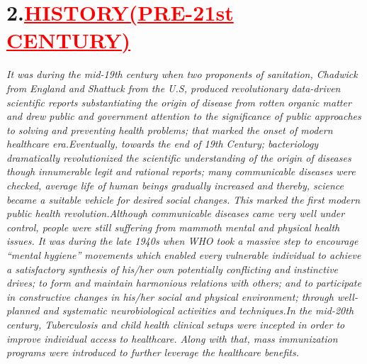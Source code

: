 \documentclass[12pt]{article}
\begin{document}
\section*{\textbf{2.\hspace{1cm}\textcolor{red}{\underline{\huge{HISTORY(PRE-21st CENTURY)}}}}}
\hspace{1cm}\large{\emph{It was during the mid-19th century when two proponents of sanitation, Chadwick from England and Shattuck from the U.S, produced revolutionary data-driven scientific reports substantiating the origin of disease from rotten organic matter and drew public and government attention to the significance of public approaches to solving and preventing health problems; that marked the onset of modern healthcare era.\newline Eventually, towards the end of 19th Century; bacteriology dramatically revolutionized the scientific understanding of the origin of diseases though innumerable legit and rational reports; many communicable diseases were checked, average life of human beings gradually increased and thereby, science became a suitable vehicle for desired social changes. This marked the first modern public health revolution.\newline Although communicable diseases came very well under control, people were still suffering from mammoth mental and physical health issues. It was during the late 1940s when WHO took a massive step to encourage “mental hygiene” movements which enabled every vulnerable individual to achieve a satisfactory synthesis of his/her own potentially conflicting and instinctive drives; to form and maintain harmonious relations with others; and to participate in constructive changes in his/her social and physical environment; through well-planned and systematic neurobiological activities and techniques.\newline In the mid-20th century, Tuberculosis and child health clinical setups were incepted in order to improve individual access to healthcare. Along with that, mass immunization programs were introduced to further leverage the healthcare benefits.}}
\end{document}
